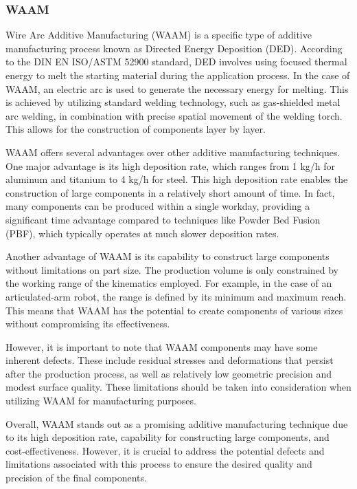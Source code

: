 \subsubsection{WAAM}
Wire Arc Additive Manufacturing (WAAM) is a specific type of additive manufacturing process known as Directed Energy Deposition (DED). According to the DIN EN ISO/ASTM 52900 standard, DED involves using focused thermal energy to melt the starting material during the application process. In the case of WAAM, an electric arc is used to generate the necessary energy for melting. This is achieved by utilizing standard welding technology, such as gas-shielded metal arc welding, in combination with precise spatial movement of the welding torch. This allows for the construction of components layer by layer.

WAAM offers several advantages over other additive manufacturing techniques. One major advantage is its high deposition rate, which ranges from 1 kg/h for aluminum and titanium to 4 kg/h for steel. This high deposition rate enables the construction of large components in a relatively short amount of time. In fact, many components can be produced within a single workday, providing a significant time advantage compared to techniques like Powder Bed Fusion (PBF), which typically operates at much slower deposition rates.

Another advantage of WAAM is its capability to construct large components without limitations on part size. The production volume is only constrained by the working range of the kinematics employed. For example, in the case of an articulated-arm robot, the range is defined by its minimum and maximum reach. This means that WAAM has the potential to create components of various sizes without compromising its effectiveness.

However, it is important to note that WAAM components may have some inherent defects. These include residual stresses and deformations that persist after the production process, as well as relatively low geometric precision and modest surface quality. These limitations should be taken into consideration when utilizing WAAM for manufacturing purposes.

Overall, WAAM stands out as a promising additive manufacturing technique due to its high deposition rate, capability for constructing large components, and cost-effectiveness. However, it is crucial to address the potential defects and limitations associated with this process to ensure the desired quality and precision of the final components.

